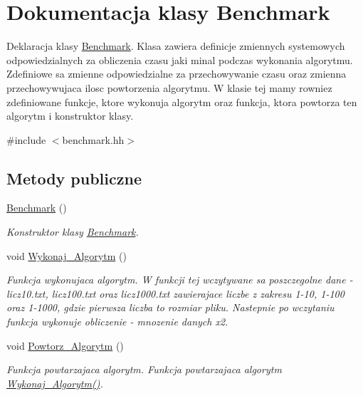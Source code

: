 \hypertarget{class_benchmark}{\section{\-Dokumentacja klasy \-Benchmark}
\label{class_benchmark}
}


\-Deklaracja klasy \hyperlink{class_benchmark}{\-Benchmark}. \-Klasa zawiera definicje zmiennych systemowych odpowiedzialnych za obliczenia czasu jaki minal podczas wykonania algorytmu. \-Zdefiniowe sa zmienne odpowiedzialne za przechowywanie czasu oraz zmienna przechowywujaca ilosc powtorzenia algorytmu. \-W klasie tej mamy rowniez zdefiniowane funkcje, ktore wykonuja algorytm oraz funkcja, ktora powtorza ten algorytm i konstruktor klasy.  




{\ttfamily \#include $<$benchmark.\-hh$>$}

\subsection*{\-Metody publiczne}
\begin{DoxyCompactItemize}
\item 
\hyperlink{class_benchmark_acfca497989836a688d44477802e822d8}{\-Benchmark} ()
\begin{DoxyCompactList}\small\item\em \-Konstruktor klasy \hyperlink{class_benchmark}{\-Benchmark}. \end{DoxyCompactList}\item 
void \hyperlink{class_benchmark_aec505cc255177517a37e06e3b49f5911}{\-Wykonaj\-\_\-\-Algorytm} ()
\begin{DoxyCompactList}\small\item\em \-Funkcja wykonujaca algorytm. \-W funkcji tej wczytywane sa poszczegolne dane -\/ licz10.\-txt, licz100.\-txt oraz licz1000.\-txt zawierajace liczbe z zakresu 1-\/10, 1-\/100 oraz 1-\/1000, gdzie pierwsza liczba to rozmiar pliku. \-Nastepnie po wczytaniu funkcja wykonuje obliczenie -\/ mnozenie danych x2. \end{DoxyCompactList}\item 
void \hyperlink{class_benchmark_a30d6b228fb51d62162e12309784b1523}{\-Powtorz\-\_\-\-Algorytm} ()
\begin{DoxyCompactList}\small\item\em \-Funkcja powtarzajaca algorytm. \-Funkcja powtarzajaca algorytm \hyperlink{class_benchmark_aec505cc255177517a37e06e3b49f5911}{\-Wykonaj\-\_\-\-Algorytm()}. \end{DoxyCompactList}\end{DoxyCompactItemize}
